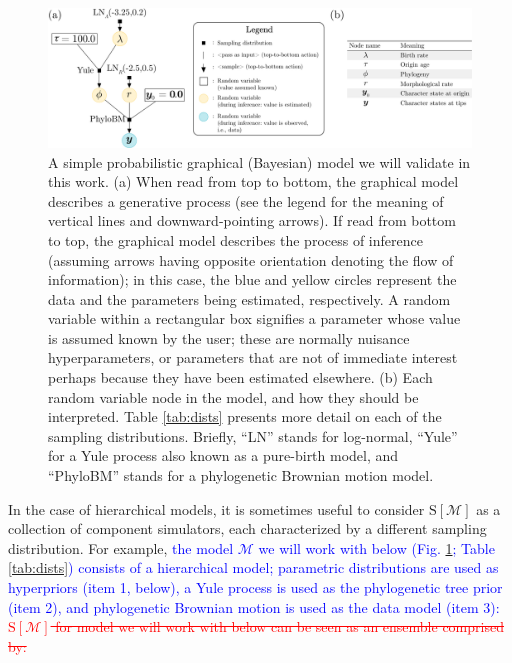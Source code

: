 \documentclass[oneside]{article}
\begin{document}
\begin{figure}%
  \centering
  \includegraphics[width=\linewidth]{../figures/graphical_model_manual.pdf}    
  \caption{
    A simple probabilistic graphical (Bayesian) model we will validate in this work.
    (a) When read from top to bottom, the graphical model describes a generative process (see the legend for the meaning of vertical lines and downward-pointing arrows).
    If read from bottom to top, the graphical model describes the process of inference (assuming arrows having opposite orientation denoting the flow of information); in this case, the blue and yellow circles represent the data and the parameters being estimated, respectively.
    A random variable within a rectangular box signifies a parameter whose value is assumed known by the user; these are normally nuisance hyperparameters, or parameters that are not of immediate interest perhaps because they have been estimated elsewhere.
    (b) Each random variable node in the model, and how they should be interpreted.
    Table \ref{tab:dists} presents more detail on each of the sampling distributions.
    Briefly, ``LN'' stands for log-normal, ``Yule'' for a Yule process also known as a pure-birth model, and ``PhyloBM'' stands for a phylogenetic Brownian motion model.
  }  
  \label{fig:pgm} 
\end{figure}
 
In the case of hierarchical models, it is sometimes useful to consider $\text{S}[\mathcal{M}]$ as a collection of component simulators, each characterized by a different sampling distribution.
For example, \textcolor{blue}{the model $\mathcal{M}$ we will work with below (Fig. \ref{fig:pgm}; Table \ref{tab:dists}) consists of a hierarchical model; parametric distributions are used as hyperpriors (item 1, below), a Yule process is used as the phylogenetic tree prior (item 2), and phylogenetic Brownian motion is used as the data model (item 3):}\textcolor{red}{\st{$\text{S}[\mathcal{M}]$ for model we will work with below can be seen as an ensemble comprised by:}}
\end{document}
